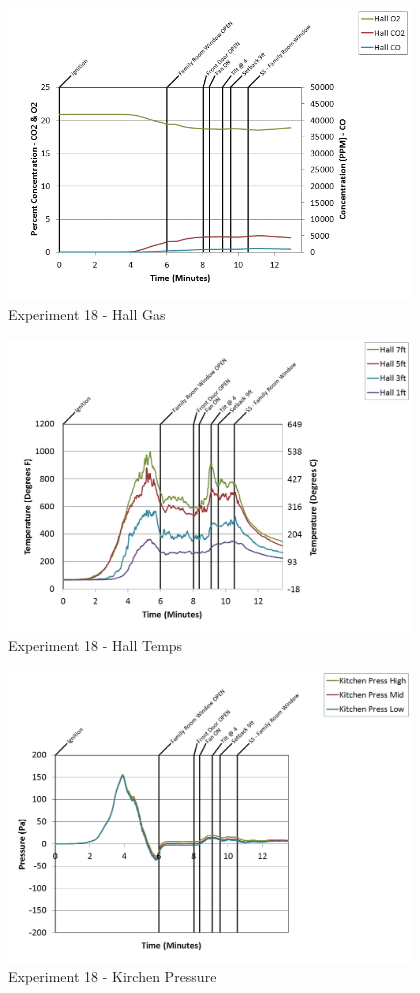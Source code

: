 \documentclass{article}
\begin{document}
\begin{appendices}
\begin{figure}[h!]
	\centering
	\includegraphics[height=3.05in]{0_Images/Results_Charts/Exp_18_Charts/HallGas.png}
	\caption{Experiment 18 - Hall Gas}
\end{figure}

\clearpage

\begin{figure}[h!]
	\centering
	\includegraphics[height=3.05in]{0_Images/Results_Charts/Exp_18_Charts/HallTemps.png}
	\caption{Experiment 18 - Hall Temps}
\end{figure}


\begin{figure}[h!]
	\centering
	\includegraphics[height=3.05in]{0_Images/Results_Charts/Exp_18_Charts/KirchenPressure.png}
	\caption{Experiment 18 - Kirchen Pressure}
\end{figure}


\end{appendices}
\end{document}
